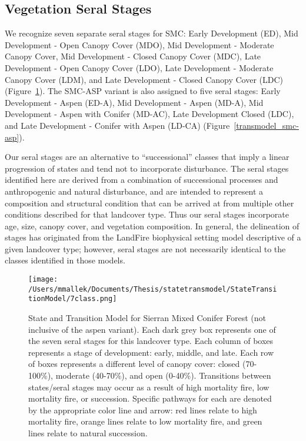 \subsection*{Vegetation Seral Stages}
We recognize seven separate seral stages for SMC: Early Development (ED), Mid Development - Open Canopy Cover (MDO), Mid Development - Moderate Canopy Cover, Mid Development - Closed Canopy Cover (MDC), Late Development - Open Canopy Cover (LDO), Late Development - Moderate Canopy Cover (LDM), and Late Development - Closed Canopy Cover (LDC) (Figure~\ref{transmodel_smc}). The SMC-ASP variant is also assigned to five seral stages: Early Development - Aspen (ED-A), Mid Development - Aspen (MD-A), Mid Development - Aspen with Conifer (MD-AC), Late Development Closed (LDC), and Late Development - Conifer with Aspen (LD-CA) (Figure~\ref{transmodel_smc-asp}).

Our seral stages are an alternative to ``successional'' classes that imply a linear progression of states and tend not to incorporate disturbance. The seral stages identified here are derived from a combination of successional processes and anthropogenic and natural disturbance, and are intended to represent a composition and structural condition that can be arrived at from multiple other conditions described for that landcover type. Thus our seral stages incorporate age, size, canopy cover, and vegetation composition. In general, the delineation of stages has originated from the LandFire biophysical setting model descriptive of a given landcover type; however, seral stages are not necessarily identical to the classes identified in those models.


\begin{figure}[hbp]
\centering
\texttt{[image: /Users/mmallek/Documents/Thesis/statetransmodel/StateTransitionModel/7class.png]}
\caption{State and Transition Model for Sierran Mixed Conifer Forest (not inclusive of the aspen variant). Each dark grey box represents one of the seven seral stages for this landcover type. Each column of boxes represents a stage of development: early, middle, and late. Each row of boxes represents a different level of canopy cover: closed (70-100\%), moderate (40-70\%), and open (0-40\%). Transitions between states/seral stages may occur as a result of high mortality fire, low mortality fire, or succession. Specific pathways for each are denoted by the appropriate color line and arrow: red lines relate to high mortality fire, orange lines relate to low mortality fire, and green lines relate to natural succession.} 
\label{transmodel_smc}
\end{figure}

